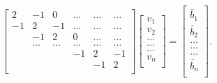 \documentclass[%
oneside,                 %
final,                   %
10pt]{article}
\begin{document}
\[
     \begin{bmatrix}
                           2& -1 & 0 &\dots   & \dots &\dots \\
                           -1 & 2 & -1 &\dots &\dots &\dots \\
                           & -1 & 2 & 0 & \dots & \dots \\
                           & \dots   & \dots &\dots   &\dots & \dots \\
                           &   &  &-1  &2& -1 \\
                           &    &  &   &-1 & 2 \\
                      \end{bmatrix}\begin{bmatrix}
                           v_1\\
                           v_2\\
                           \dots \\
                          \dots  \\
                          \dots \\
                           v_n\\
                      \end{bmatrix}
  =\begin{bmatrix}
                          \tilde{ b_1}\\
                          \tilde{b_2}\\
                           \dots \\
                           \dots \\
                          \dots \\
                           \tilde{b_n}\\
                      \end{bmatrix}.
\]
\end{document}
